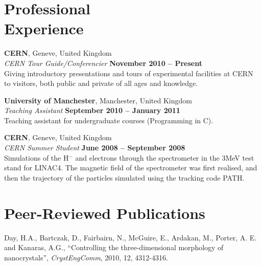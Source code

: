 \documentclass[margin,line]{resume}
\begin{document}
\begin{resume}
    \section{\mysidestyle Professional\\Experience}


    \textbf{CERN}, Geneve, United Kingdom \vspace{2mm}\\\vspace{1mm}%
    \textsl{CERN Tour Guide/Conferencier} \hfill \textbf{November 2010 -- Present}\\
    Giving introductory presentations and tours of experimental facilities at CERN to visitors, both public and private of all ages and knowledge.

    \textbf{University of Manchester}, Manchester, United Kingdom \vspace{2mm}\\\vspace{1mm}%
    \textsl{Teaching Assistant} \hfill \textbf{September 2010 -- January 2011}\\
    Teaching assistant for undergraduate courses (Programming in C).

    \textbf{CERN}, Geneve, United Kingdom \vspace{2mm}\\\vspace{1mm}%
    \textsl{CERN Summer Student} \hfill \textbf{June 2008 -- September 2008}\\
    Simulations of the H$^{-}$ and electrons through the spectrometer in the 3MeV test stand for LINAC4. The magnetic field of the spectrometer was first realised, and then the trajectory of the particles simulated using the tracking code PATH.


    \section{\mysidestyle Peer-Reviewed Publications}

    
	Day, H.A.,  Bartczak, D.,  Fairbairn, N.,  McGuire, E., Ardakan, M., Porter, A. E. and Kanaras, A.G.,
    ``Controlling the three-dimensional morphology of nanocrystals'',
    \textsl{CrystEngComm}, 2010, 12, 4312-4316.


\end{resume}
\end{document}
